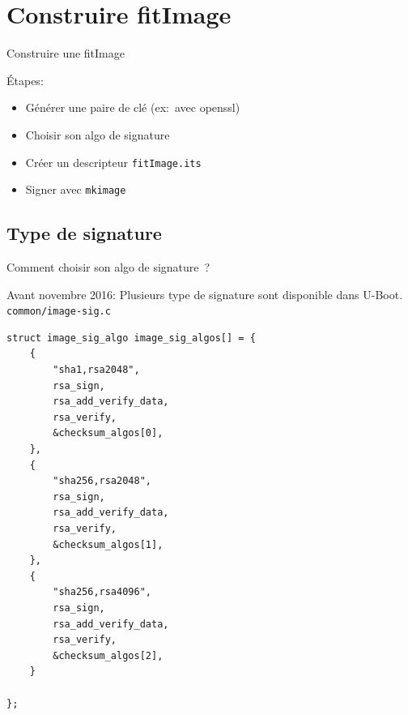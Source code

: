\documentclass[aspectratio=169]{beamer}
\begin{document}
%



\section{Construire fitImage}

\begin{frame}
\begin{center}
\huge{Construire une fitImage}
\end{center}
\end{frame}

\begin{frame}
Étapes:
\begin{center}
\begin{itemize}
	\item Générer une paire de clé (ex: avec openssl)
	\item Choisir son algo de signature
	\item Créer un descripteur \texttt{fitImage.its}
	\item Signer avec \texttt{mkimage}
\end{itemize}
\end{center}
\end{frame}


\subsection{Type de signature}

\begin{frame}
\begin{center}
\large{Comment choisir son algo de signature ?}
\end{center}
\end{frame}

\begin{frame}[fragile]
Avant novembre 2016:
Plusieurs type de signature sont disponible dans U-Boot.\newline
\texttt{common/image-sig.c}
\begin{lstlisting}[style=shell,basicstyle=\tiny\ttfamily\color{white}]
struct image_sig_algo image_sig_algos[] = {
    {
        "sha1,rsa2048",
        rsa_sign,
        rsa_add_verify_data,
        rsa_verify,
        &checksum_algos[0],
    },
    {
        "sha256,rsa2048",
        rsa_sign,
        rsa_add_verify_data,
        rsa_verify,
        &checksum_algos[1],
    },
    {
        "sha256,rsa4096",
        rsa_sign,
        rsa_add_verify_data,
        rsa_verify,
        &checksum_algos[2],
    }

};
\end{lstlisting}
\end{frame}
\end{document}
